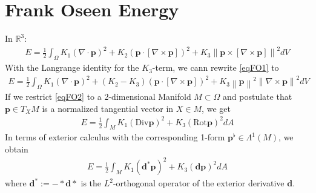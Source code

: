 \documentclass{scrartcl}
\newcommand{\exd}{\mathbf{d}}
\newcommand{\excod}{\exd^{*}} %
\newcommand{\Div}{\text{Div}}
\newcommand{\Rot}{\text{Rot}}
\newcommand{\R}{\mathds{R}}
\newcommand{\M}{M}
\newcommand{\dA}{dA}
\newcommand{\p}{\mathbf{p}}
\newcommand{\pfl}{\mathbf{p}^{\flat}}
\begin{document}
\section{Frank Oseen Energy}

In \( \R^{3} \):
\begin{align}\label{eqFO1}
  E = \frac{1}{2}\int_{\Omega} K_{1}\left( \nabla\cdot\p \right)^{2} 
                        + K_{2}\left( \p\cdot\left[ \nabla\times\p \right] \right)^{2}
                        + K_{3}\left\| \p\times\left[ \nabla\times\p \right] \right\|^{2} dV
\end{align}
With the Langrange identity for the \( K_{3} \)-term, we cann rewrite \eqref{eqFO1} to
\begin{align}\label{eqFO2}
  E = \frac{1}{2}\int_{\Omega} K_{1}\left( \nabla\cdot\p \right)^{2} 
                        + (K_{2}-K_{3})\left( \p\cdot\left[ \nabla\times\p \right] \right)^{2}
                        + K_{3}\left\| \p \right\|^{2}\left\| \nabla\times\p \right\|^{2} dV
\end{align}
If we restrict \eqref{eqFO2} to a 2-dimensional Manifold \( \M\subset\Omega \) 
and postulate that \( \p\in T_{X}\M \) is a normalized tangential vector in \( X\in\M \), we get
\begin{align}
  E = \frac{1}{2} \int_{\M} K_{1}\left( \Div\p \right)^{2} + K_{3}\left( \Rot \p \right)^{2} \dA 
\end{align}
In terms of exterior calculus with the corresponding 1-form \( \pfl\in\Lambda^{1}(M) \), we obtain
\begin{align}
  E = \frac{1}{2} \int_{\M} K_{1}\left( \excod\p \right)^{2} + K_{3}\left( \exd \p \right)^{2} \dA
\end{align}
where \( \excod := -* \exd * \) is the \( L^{2} \)-orthogonal operator of the exterior derivative \( \exd \). 
  
\end{document}
